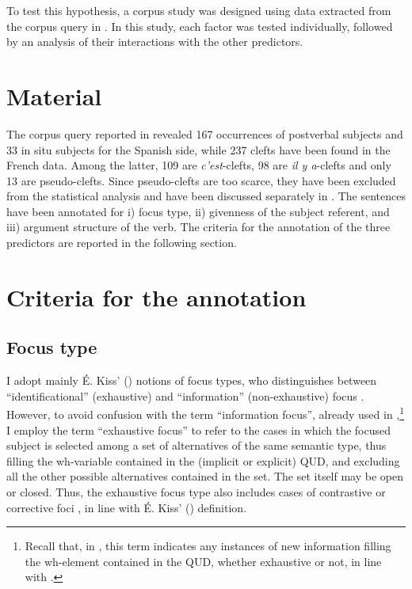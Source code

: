 To test this hypothesis, a corpus study was designed using data extracted from the corpus query in . In this study, each factor was tested individually, followed by an analysis of their interactions with the other predictors.
\section{Material} \label{sub:6.3}
The corpus query reported in  revealed 167 occurrences of postverbal subjects and 33 in situ subjects for the Spanish side, while 237 clefts have been found in the French data. Among the latter, 109 are \textit{c'est}-clefts, 98 are \textit{il y a}-clefts and only 13 are pseudo-clefts. Since pseudo-clefts are too scarce, they have been excluded from the statistical analysis and have been discussed separately in . The sentences have been annotated for i) focus type, ii) givenness of the subject referent, and iii) argument structure of the verb. The criteria for the annotation of the three predictors are reported in the following section.

\section{Criteria for the annotation} \label{sub:6.4}
\subsection{Focus type} \label{sub:6.4.1}
I adopt mainly É. Kiss' (\citeyear{kiss1998identificational}) notions of focus types, who distinguishes between ``identificational” (exhaustive) and ``information” (non-exhaustive) focus \parencite{kiss1998identificational}. However, to avoid confusion with the term ``information focus”, already used in ,\footnote{Recall that, in , this term indicates any instances of new information filling the wh-element contained in the QUD, whether exhaustive or not, in line with \textcite{krifka2008basic}.} I employ the term ``exhaustive focus'' to refer to the cases in which the focused subject is selected among a set of alternatives of the same semantic type, thus filling the wh-variable contained in the (implicit or explicit) QUD, and excluding all the other possible alternatives contained in the set. The set itself may be open or closed. Thus, the exhaustive focus type also includes cases of contrastive or corrective foci \parencite{van2004incompatibility, steube2001correction,REPP20101333}, in line with É. Kiss' (\citeyear{kiss1998identificational}) definition.

